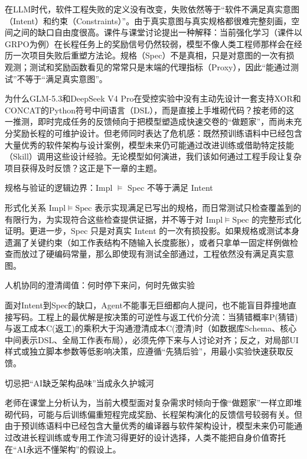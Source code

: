 \documentclass[UTF8,a4paper,11pt,fontset=fandol]{ctexart}
\begin{document}
在LLM时代，软件工程失败的定义没有改变，失败依然等于“软件不满足真实意图（Intent）和约束（Constraints）”。由于真实意图与真实规格都很难完整刻画，空间之间的缺口自由度很高。课件与课堂讨论提出一种解释：当前强化学习（课件以GRPO为例）在长程任务上的奖励信号仍然较弱，模型不像人类工程师那样会在经历一次项目失败后重塑方法论。规格（Spec）不是真相，只是对意图的一次有损观测；测试和奖励函数看见的常常只是末端的代理指标（Proxy），因此“能通过测试”不等于“满足真实意图”。

为什么GLM-5.3和DeepSeek V4 Pro在受控实验中没有主动先设计一套支持XOR和CONCAT的Python符号中间语言（DSL），而是直接上手堆砌代码？按老师的这一推测，即时完成任务的反馈倾向于把模型塑造成快速交卷的“做题家”，而尚未充分奖励长程的可维护设计。但老师同时表达了危机感：既然预训练语料中已经包含大量优秀的软件架构与设计案例，模型未来仍可能通过改进训练或借助特定技能（Skill）调用这些设计经验。无论模型如何演进，我们该如何通过工程手段让复杂项目获得及时反馈？这正是下一章的主题。

\begin{importantbox}{规格与验证的逻辑边界：Impl \ensuremath{\models} Spec 不等于满足 Intent}

形式化关系 \(\mathrm{Impl} \models \mathrm{Spec}\) 表示实现满足已写出的规格，而日常测试只检查覆盖到的有限行为，为实现符合这些检查提供证据，并不等于对 \(\mathrm{Impl} \models \mathrm{Spec}\) 的完整形式化证明。更进一步，Spec 只是对真实 Intent 的一次有损投影。如果规格或测试本身遗漏了关键约束（如工作表结构不随输入长度膨胀），或者只拿单一固定样例做检查而放过了硬编码常量，那么即使现有测试全部通过，工程依然没有满足真实意图。

\end{importantbox}

\begin{knowledgebox}{人机协同的澄清阈值：何时停下来问，何时先做实验}

面对Intent到Spec的缺口，Agent不能事无巨细都向人提问，也不能盲目莽撞地直接写码。工程上的最优解是按决策的可逆性与返工代价分流：当猜错概率P(猜错)与返工成本C(返工)的乘积大于沟通澄清成本C(澄清)时（如数据库Schema、核心中间表示DSL、全局工作表布局），必须先停下来与人讨论对齐；反之，对局部UI样式或独立脚本参数等低影响决策，应遵循“先猜后验”，用最小实验快速获取反馈。

\end{knowledgebox}

\begin{warningbox}{切忌把“AI缺乏架构品味”当成永久护城河}

老师在课堂上分析认为，当前大模型面对复杂需求时倾向于像“做题家”一样立即堆砌代码，可能与后训练偏重短程完成奖励、长程架构演化的反馈信号较弱有关。但由于预训练语料中已经包含大量优秀的编译器与软件架构设计，模型未来仍可能通过改进长程训练或专用工作流习得更好的设计选择，人类不能把自身价值寄托在“AI永远不懂架构”的假设上。

\end{warningbox}
\end{document}
